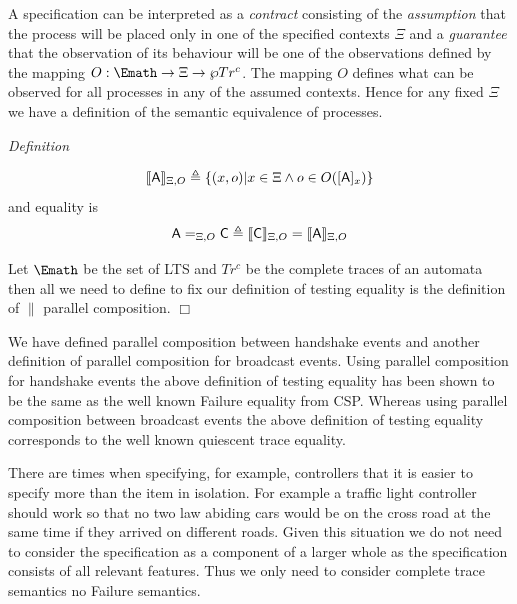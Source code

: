 \documentclass[]{article}
\begin{document}
A specification can be  interpreted as a \emph{contract} consisting of the \emph{assumption} that the process will be placed only in one of the specified contexts $\Xi$ and a \emph{guarantee} that the observation of its behaviour will be one of the observations defined by the mapping $O: \Emath \rightarrow\Xi\rightarrow \wp Tr^c$.  The mapping $O$ defines what can be observed  for all processes in any of the assumed contexts. Hence for any fixed $\Xi$  we have a definition of the semantic equivalence of processes.

\emph{Definition}

\[
 \llbracket {\sf A}\rrbracket_{\Xi,O} \triangleq  \{(x,o) | x \in \Xi \wedge  o\in O([{\sf  A}]_x)\}
\]
and equality is
\[
{\sf A} =_{\Xi, O} {\sf  C} \triangleq   \llbracket {\sf C}\rrbracket_{\Xi,O} = \llbracket {\sf A}\rrbracket_{\Xi,O}
\]

Let $\Emath$ be the set of LTS and $Tr^c$ be the complete traces of an automata  then all we need to define to fix our definition of testing equality is the definition of $\parallel$ parallel composition.
\hspace{\fill}$\Box$

We have defined parallel composition between handshake events  and  another definition of parallel composition for broadcast events.  Using parallel composition for {\sf handshake events} the above definition of testing equality has been shown to be the same as the well known {\sf Failure equality} from CSP.  Whereas using parallel composition between {\sf broadcast events} the above definition of testing equality corresponds to the well known {\sf quiescent trace} equality.

There are times when specifying, for example, controllers that it is easier to specify more than the item in isolation. For example a traffic light controller should work so that no two law abiding cars would be on the cross road at the same time if they arrived on different roads. 
Given this situation we do not need to consider the specification as a component of a larger whole as the specification consists of all relevant features. Thus we only need to consider complete trace semantics no Failure semantics. 
\end{document}
